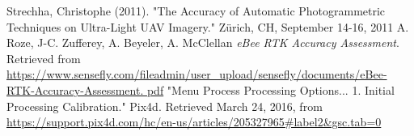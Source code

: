\documentclass{article}
\begin{document}
\begin{thebibliography}{9}
Strechha,  Christophe (2011). "The Accuracy of Automatic Photogrammetric Techniques on Ultra-Light
UAV Imagery."  Zürich, CH, September
14-16, 2011
A. Roze, J-C. Zufferey, A. Beyeler, A. McClellan \textit{eBee RTK Accuracy Assessment}.
Retrieved from
\url{https://www.sensefly.com/fileadmin/user_upload/sensefly/documents/eBee-RTK-Accuracy-Assessment.
pdf}
"Menu Process Processing Options... 1. Initial Processing Calibration." Pix4d. Retrieved March 24,
2016, from \url{https://support.pix4d.com/hc/en-us/articles/205327965#label2&gsc.tab=0}
\end{thebibliography}
\thispagestyle{lastpage}
\end{document}
